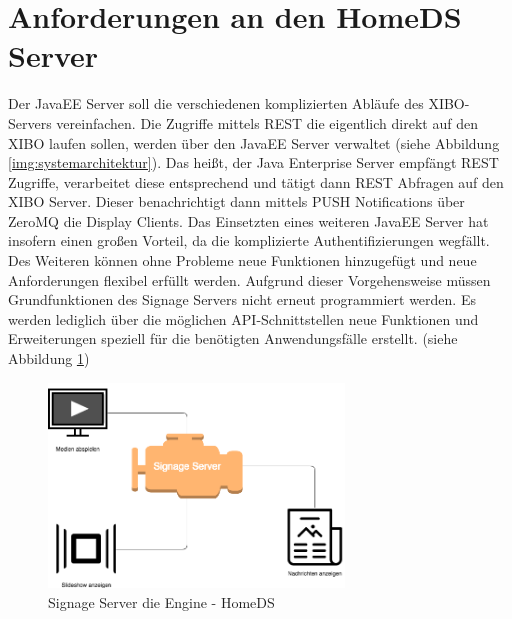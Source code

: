 \section{Anforderungen an den HomeDS Server}\label{sec:homeds}
Der JavaEE Server soll die verschiedenen komplizierten Abläufe des XIBO-Servers vereinfachen. Die Zugriffe mittels REST die eigentlich direkt auf den XIBO laufen sollen, werden über den JavaEE Server verwaltet (siehe Abbildung \ref{img:systemarchitektur}). Das heißt, der Java Enterprise Server empfängt REST Zugriffe, verarbeitet diese entsprechend und tätigt dann REST Abfragen auf den XIBO Server. Dieser benachrichtigt dann mittels PUSH Notifications über ZeroMQ die Display Clients. Das Einsetzten eines weiteren JavaEE Server hat insofern einen großen Vorteil, da die komplizierte Authentifizierungen wegfällt. Des Weiteren können ohne Probleme neue Funktionen hinzugefügt und neue Anforderungen flexibel erfüllt werden. Aufgrund dieser Vorgehensweise müssen Grundfunktionen des Signage Servers nicht erneut programmiert werden. Es werden lediglich über die möglichen API-Schnittstellen neue Funktionen und Erweiterungen speziell für die benötigten Anwendungsfälle erstellt. (siehe Abbildung \ref{img:xiboengine})

\begin{figure}[H]
\centering
\includegraphics[width=0.7\textwidth]{images/08_HomeDsWeb/SignageEngine.png}
\caption{Signage Server die Engine - HomeDS}
\label{img:xiboengine}
\end{figure}
 
